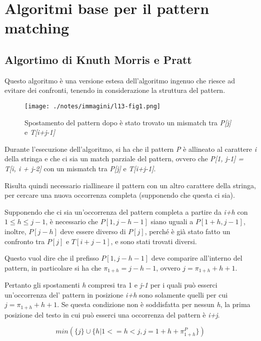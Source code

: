 \section{Algoritmi base per il pattern matching}\label{algoritmi-base-per-il-pattern-matching}

\subsection{Algortimo di Knuth Morris e Pratt}\label{algortimo-di-knuth-morris-e-pratt}

Questo algoritmo è una versione estesa dell'algoritmo ingenuo che riesce ad evitare dei confronti, tenendo in considerazione la struttura del pattern.

\begin{figure}[htbp]
\centering
\texttt{[image: ./notes/immagini/l13-fig1.png]}
\caption{Spostamento del pattern dopo è stato trovato un mismatch tra \textit{P[j]} e \textit{T[i+j-1]}}
\end{figure}

Durante l'esecuzione dell'algoritmo, si ha che il pattern \textit{P} è allineato al carattere \textit{i} della stringa e che ci sia un match parziale del pattern, ovvero che \textit{P[1, j-1] = T[i, i + j-2]} con un mismatch tra \textit{P[j]} e \textit{T[i+j-1]}. 

Risulta quindi necessario riallineare il pattern con un altro carattere della stringa, per cercare una nuova occorrenza completa (supponendo che questa ci sia).

Supponendo che ci sia un'occorrenza del pattern completa a partire da \emph{i+h} con $ 1 \leq h \leq j-1$, è necessario che $P[1, j-h-1]$ siano uguali a $P[1+h, j-1]$, inoltre, $P[j-h]$ deve essere diverso di
$P[j]$, perché è già stato fatto un confronto tra $P[j]$ e $T[i+j-1]$, e sono stati trovati diversi.

Questo vuol dire che il prefisso $P[1, j-h-1]$ deve comparire all'interno del pattern, in particolare si ha che $\pi_{1+h} = j - h -1$, ovvero $j = \pi_{1+h} +h +1$.

Pertanto gli spostamenti \textit{h} compresi tra 1 e \textit{j-1} per i quali può esserci un'occorrenza del' pattern in posizione \textit{i+h} sono solamente quelli per cui $j = \pi_{1+h} +h +1$.
Se questa condizione non è soddisfatta per nessun \textit{h}, la prima posizione del testo in cui può esserci una occorrenza del pattern è \textit{i+j}.

$$
min(\{j\} \cup \{h | 1 <= h < j, j = 1 + h + \pi_{1+h}^P\})
$$

